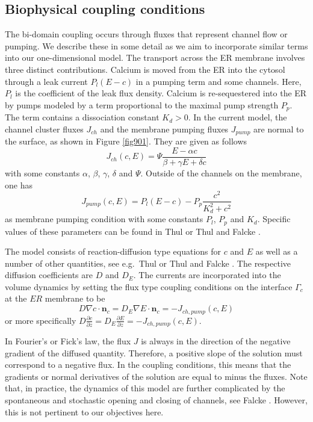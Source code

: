 \subsection{Biophysical coupling conditions}
\label{subsec:biocouple}
%
%
The bi-domain coupling occurs through fluxes that represent channel flow or pumping. We describe these in some detail as we aim to incorporate similar terms into our one-dimensional model. The transport across the ER membrane involves three distinct contributions. Calcium is moved
from the ER into the cytosol through a leak current $P_l (E-c)$ in a pumping term and some channels.
Here, $P_l$ is the coefficient of the leak flux density. Calcium is re-sequestered into the ER by 
pumps modeled by a term proportional to the maximal pump strength $P_p$. The term contains a dissociation constant $K_d>0$. 
In the current model, the channel cluster fluxes $J_{ch}$ and the membrane pumping fluxes $J_{pump}$ are 
normal to the surface, as shown in Figure \ref{fig901}. They are given as follows  \cite[(2.1)]{l10}
%
\begin{equation}
\label{ch66}
J_{ch}(c,E)=\Psi \frac{E-\alpha c}{\beta+\gamma E+\delta c}
\end{equation}
%
with some constants $\alpha$, $\beta$, $\gamma$, $\delta$ and $\Psi$. Outside of the channels on the membrane, one has
%
\begin{equation}
\label{987}
J_{pump}(c,E)=P_{l}(E-c) -P_{p}\frac{c^{2}}{K_{d} ^2 +c^2}
\end{equation}
%
as membrane pumping condition with some constants $P_l$, $P_p$ and $K_d$.
Specific values of these parameters can be found in Thul \cite{l10} or Thul and Falcke \cite{l11}.

The model consists of reaction-diffusion type equations for $c$ and $E$ as well as a number of other quantities, 
see e.g.\ Thul \cite[Chapter 2]{l10} or Thul and Falcke \cite{l11}.
The respective diffusion coefficients are $D$ and $D_E$.
The currents are incorporated into the volume dynamics by setting the 
flux type coupling conditions on the interface $\Gamma_c$ at the $ER$
membrane to be
%
\begin{equation}
\label{couple_bio}
D\nabla c \cdot \mathbf{n}_c= D_E \nabla E \cdot \mathbf{n}_c=-J_{ch,pump}(c,E) 
\end{equation}
%
or more specifically $D\frac{\partial c}{\partial z}=D_E \frac{\partial E}{\partial z}=-J_{ch,pump}(c,E)$.

In Fourier's or Fick's law, the flux $J$ is always in the direction of the negative gradient of the diffused quantity. 
Therefore, a positive slope of the solution must correspond to a negative flux. In the coupling conditions, this means that the 
gradients or normal derivatives of the solution are equal to minus the fluxes.
Note that, in practice, the dynamics of this model are further complicated by the spontaneous and stochastic opening and closing of channels, see Falcke \cite{l8}. However, this is not pertinent to our objectives here.


